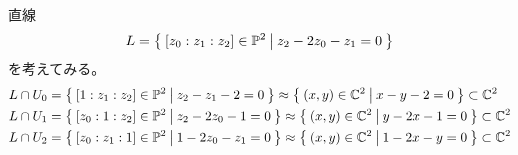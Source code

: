 \documentclass{ltjsreport}
\begin{document}
  \begin{eg}
    直線
    \[
    L=\left\{\:[z_0:z_1:z_2]\in\mathbb{P}^2\:\middle|\:z_2-2z_0-z_1=0\:\right\}  
    \]
    を考えてみる。
    \begin{align*}
    &L\cap U_0=\left\{\:[1:z_1:z_2]\in\mathbb{P}^2\:\middle|\:z_2-z_1-2=0\:\right\} \approx \left\{\:(x,y)\in\mathbb{C}^2\:\middle|\:x-y-2=0\:\right\}\subset \mathbb{C}^2\\
    &L\cap U_1=\left\{\:[z_0:1:z_2]\in\mathbb{P}^2\:\middle|\:z_2-2z_0-1=0\:\right\}
    \approx \left\{\:(x,y)\in\mathbb{C}^2\:\middle|\:y-2x-1=0\:\right\}\subset\mathbb{C}^2\\
    &L\cap U_2=\left\{\:[z_0:z_1:1]\in\mathbb{P}^2\:\middle|\:1-2z_0-z_1=0\:\right\}
    \approx \left\{\:(x,y)\in\mathbb{C}^2\:\middle|\:1-2x-y=0\:\right\}\subset\mathbb{C}^2
    \end{align*}
    
  \end{eg}
\end{document}
